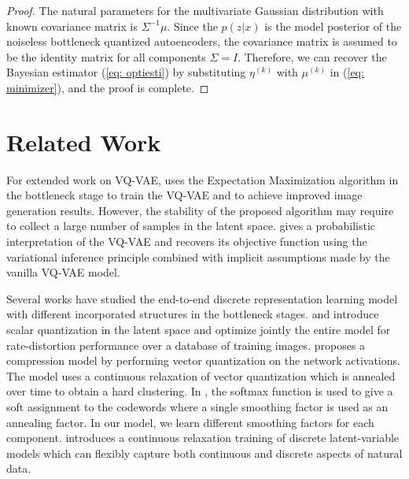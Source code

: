 \documentclass[letterpaper]{article} %
\begin{document}
\begin{proof}
The natural parameters for the multivariate Gaussian distribution with known covariance matrix is $\Sigma^{-1}\mu$. Since the $p(z|x)$ is the model posterior of the noiseless bottleneck quantized autoencoders, the covariance matrix is assumed to be the identity matrix for all components $\Sigma = I$. Therefore, we can recover the Bayesian estimator (\ref{eq: optiesti}) by substituting $\eta^{(k)}$ with $\mu^{(k)}$ in (\ref{eq: minimizer}), and the proof is complete.
\end{proof}
\section{Related Work}
\label{Background}
For extended work on VQ-VAE, \cite{roy:18} uses the Expectation Maximization algorithm in the bottleneck stage to train the VQ-VAE and to achieve improved image generation results. However, the stability of the proposed algorithm may require to collect a large number of samples in the latent space. \cite{Henter2018} gives a probabilistic interpretation of the VQ-VAE and recovers its objective function using the variational inference principle combined with implicit assumptions made by the vanilla VQ-VAE model.

Several works have studied the end-to-end discrete representation learning model with different incorporated structures in the bottleneck stages. \cite{theis:17:iclr} and \cite{Balle:17:iclr}  introduce scalar quantization in the latent space and optimize jointly the entire model for rate-distortion performance over a database of training images. \cite{agustsson:17:nips} proposes a compression model by performing vector quantization on the network activations. The model uses a continuous relaxation of vector quantization which is annealed over time to obtain a hard clustering. In \cite{agustsson:17:nips}, the softmax function is used to give a soft assignment to the codewords where a single smoothing factor is used as an annealing factor. In our model, we learn different smoothing factors for each component. \cite{sonderbypoole2017} introduces a continuous relaxation training of discrete latent-variable models which can flexibly capture both continuous and discrete aspects of natural data.
\end{document}
